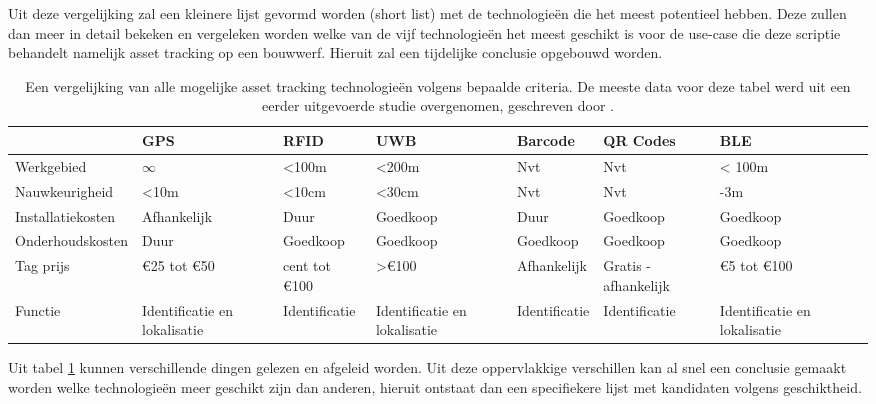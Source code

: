 Uit deze vergelijking zal een kleinere lijst gevormd worden (short list) met de technologieën die het meest potentieel hebben. Deze zullen dan meer in detail bekeken en vergeleken worden welke van de vijf technologieën het meest geschikt is voor de use-case die deze scriptie behandelt namelijk asset tracking op een bouwwerf. Hieruit zal een tijdelijke conclusie opgebouwd worden.\\

\begin{table}
\tiny
\begin{tabularx}{\textwidth} { 
        | >{\raggedright\arraybackslash}X 
        | >{\centering\arraybackslash}X 
        | >{\centering\arraybackslash}X 
        | >{\centering\arraybackslash}X 
        | >{\centering\arraybackslash}X 
        | >{\centering\arraybackslash}X 
        | >{\centering\arraybackslash}X 
        | >{\centering\arraybackslash}X | }
\hline
& GPS & RFID & UWB & Barcode & QR Codes & BLE \\
\hline
Werkgebied & $\infty$ & <100m & <200m & Nvt & Nvt & < 100m\\
Nauwkeurigheid & <10m & <10cm & <30cm & Nvt & Nvt & 2-3m \\
Installatiekosten & Afhankelijk & Duur & Goedkoop & Duur & Goedkoop & Goedkoop \\
Onderhoudskosten & Duur & Goedkoop & Goedkoop & Goedkoop & Goedkoop & Goedkoop  \\
Tag prijs & \euro25 tot \euro50 & 50 cent tot \euro100 & >\euro100 & Afhankelijk & Gratis - afhankelijk & \euro5 tot \euro100 \\
Functie & Identificatie en lokalisatie & Identificatie & Identificatie en lokalisatie & Identificatie & Identificatie & Identificatie en lokalisatie \\
\hline
\end{tabularx}
\caption{Een vergelijking van alle mogelijke asset tracking technologieën volgens bepaalde criteria. De meeste data voor deze tabel werd uit een eerder uitgevoerde studie overgenomen, geschreven door \textcite{Ahmed2020}.}
\label{tab:technologies}
\end{table}

Uit tabel \ref{tab:technologies} kunnen verschillende dingen gelezen en afgeleid worden. Uit deze oppervlakkige verschillen kan al snel een conclusie gemaakt worden welke technologieën meer geschikt zijn dan anderen, hieruit ontstaat dan een specifiekere lijst met kandidaten volgens geschiktheid. \\

